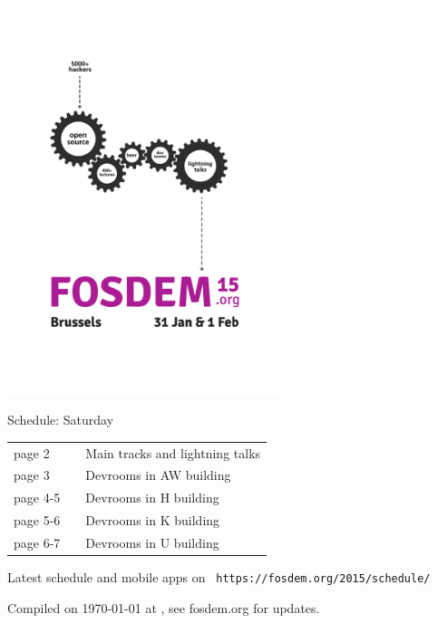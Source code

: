 \documentclass[a4paper,10pt]{article}
\begin{document}
\label{cover}
\begin{center}
\includegraphics[width=0.6\textwidth]{artwork/flyer_nobg}


{\fontsize{35}{45}\selectfont
\bf

Schedule: Saturday
}

\vfill

{\Large
\begin{tabular}{lll}
page 2   & &  Main tracks and lightning talks \\
page 3   & &  Devrooms in AW building \\
page 4-5 & &  Devrooms in H building \\
page 5-6 & &  Devrooms in K building \\
page 6-7 & &  Devrooms in U building \\
\end{tabular}

\vfill

Latest schedule and mobile apps on ~\texttt{https://fosdem.org/2015/schedule/}
}

\vfill

\end{center}

Compiled on {\ddmmyyyydate\today} at \currenttime, see fosdem.org for updates.


{%
\fontsize{10.5}{8.09}\selectfont%
\renewcommand{\arraystretch}{0.88}%
%
%
}
\end{document}
